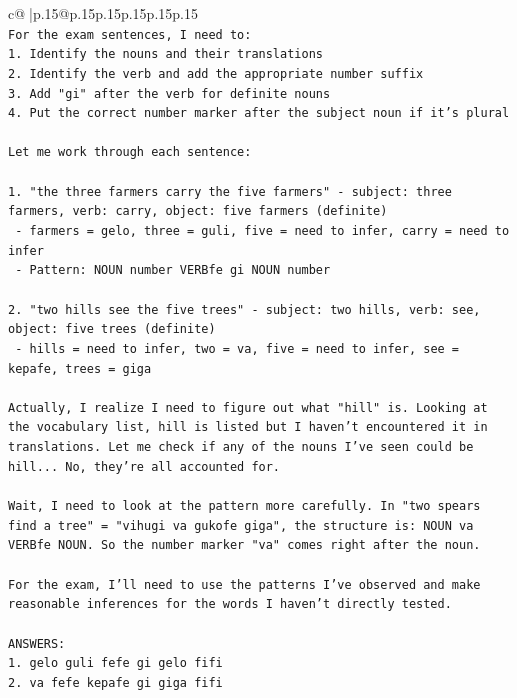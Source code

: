 \documentclass{article}
\begin{document}
{\begin{supertabular}{c@{$\;$}|p{.15\linewidth}@{}p{.15\linewidth}p{.15\linewidth}p{.15\linewidth}p{.15\linewidth}p{.15\linewidth}}
{{{\\ 
\texttt{For the exam sentences, I need to:} \\
\texttt{1. Identify the nouns and their translations} \\
\texttt{2. Identify the verb and add the appropriate number suffix} \\
\texttt{3. Add "gi" after the verb for definite nouns} \\
\texttt{4. Put the correct number marker after the subject noun if it's plural} \\
\\ 
\texttt{Let me work through each sentence:} \\
\\ 
\texttt{1. "the three farmers carry the five farmers" {-} subject: three farmers, verb: carry, object: five farmers (definite)} \\
\texttt{   {-} farmers = gelo, three = guli, five = need to infer, carry = need to infer} \\
\texttt{   {-} Pattern: NOUN number VERBfe gi NOUN number} \\
\\ 
\texttt{2. "two hills see the five trees" {-} subject: two hills, verb: see, object: five trees (definite)} \\
\texttt{   {-} hills = need to infer, two = va, five = need to infer, see = kepafe, trees = giga} \\
\\ 
\texttt{Actually, I realize I need to figure out what "hill" is. Looking at the vocabulary list, hill is listed but I haven't encountered it in translations. Let me check if any of the nouns I've seen could be hill... No, they're all accounted for.} \\
\\ 
\texttt{Wait, I need to look at the pattern more carefully. In "two spears find a tree" = "vihugi va gukofe giga", the structure is: NOUN va VERBfe NOUN. So the number marker "va" comes right after the noun.} \\
\\ 
\texttt{For the exam, I'll need to use the patterns I've observed and make reasonable inferences for the words I haven't directly tested.} \\
\\ 
\texttt{ANSWERS:} \\
\texttt{1. gelo guli fefe gi gelo fifi} \\
\texttt{2. va fefe kepafe gi giga fifi} \\
}}}
\end{supertabular}}
\end{document}
